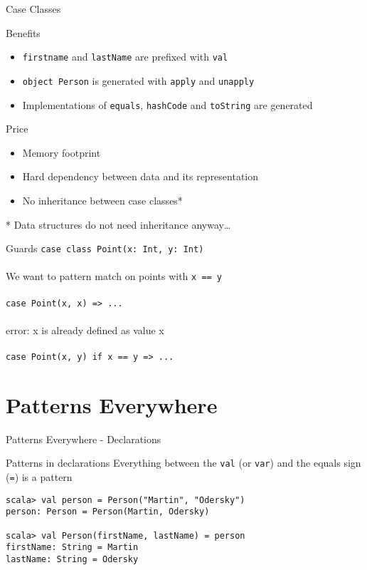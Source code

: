 \begin{frame}[fragile]{Case Classes}
\begin{block}{Benefits}
\begin{itemize}
  \item \lstinline!firstname! and \lstinline!lastName! are prefixed with \lstinline!val!
  \item \lstinline!object Person! is generated with \lstinline!apply! and \lstinline!unapply!
  \item Implementations of \lstinline!equals!, \lstinline!hashCode! and \lstinline!toString! are generated
\end{itemize}
\end{block}
\pause
\begin{alertblock}{Price}
\begin{itemize}
  \item Memory footprint
  \item Hard dependency between data and its representation
  \item No inheritance between case classes*
\end{itemize}
* Data structures do not need inheritance anyway\ldots
\end{alertblock}
\end{frame}

\begin{frame}[fragile]{Guards}
\lstinline!case class Point(x: Int, y: Int)!\\
\lstinline!!\\
We want to pattern match on points with \lstinline!x == y!\\
\lstinline!!\\
\lstinline!case Point(x, x) => ...!\\
\lstinline!!\\
\alert{error: x is already defined as value x}\\
\lstinline!!\\
\lstinline!case Point(x, y) if x == y => ...!
\end{frame}

\section{Patterns Everywhere}
\begin{frame}[fragile]{Patterns Everywhere - Declarations}
\begin{block}{Patterns in declarations}
Everything between the \lstinline!val! (or \lstinline!var!) and the equals sign
(\lstinline!=!) is a pattern
\end{block}
\begin{lstlisting}
scala> val person = Person("Martin", "Odersky")
person: Person = Person(Martin, Odersky)

scala> val Person(firstName, lastName) = person
firstName: String = Martin
lastName: String = Odersky
\end{lstlisting}
\end{frame}

